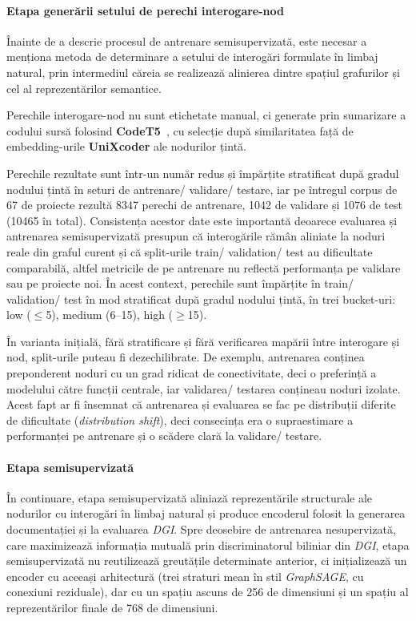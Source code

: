 \documentclass[12pt]{article}
\numberwithin{equation}{section}
\numberwithin{figure}{section}
\numberwithin{table}{section}
\theoremstyle{definition}
\theoremstyle{plain}
\begin{document}
\paragraph{Etapa generării setului de perechi interogare-nod}

Înainte de a descrie procesul de antrenare semisupervizată, este necesar a menționa metoda de determinare a setului de interogări formulate în limbaj natural, prin intermediul căreia se realizează alinierea dintre spațiul grafurilor și cel al reprezentărilor semantice.

Perechile interogare-nod nu sunt etichetate manual, ci generate prin sumarizare a codului sursă folosind \textbf{CodeT5}~\cite{wang2021codet5}, cu selecție după similaritatea față de embedding-urile \textbf{UniXcoder} ale nodurilor țintă. 

Perechile rezultate sunt într-un număr redus și împărțite stratificat după gradul nodului țintă în seturi de antrenare/ validare/ testare, iar pe întregul corpus de 67 de proiecte rezultă 8347 perechi de antrenare, 1042 de validare și 1076 de test (10465 în total). Consistența acestor date este importantă deoarece evaluarea și antrenarea semisupervizată presupun că interogările rămân aliniate la noduri reale din graful curent și că split-urile train/ validation/ test au dificultate comparabilă, altfel metricile de pe antrenare nu reflectă performanța pe validare sau pe proiecte noi. În acest context, perechile sunt împărțite în train/ validation/ test în mod stratificat după gradul nodului țintă, în trei bucket-uri: low ($\leq$5), medium (6–15), high ($\geq$15).

În varianta inițială, fără stratificare și fără verificarea mapării între interogare și nod, split-urile puteau fi dezechilibrate. De exemplu, antrenarea conținea preponderent noduri cu un grad ridicat de conectivitate, deci o preferință a modelului către funcții centrale, iar validarea/ testarea conțineau noduri izolate. Acest fapt ar fi însemnat că antrenarea și evaluarea se fac pe distribuții diferite de dificultate (\textit{distribution shift}), deci consecința era o supraestimare a performanței pe antrenare și o scădere clară la validare/ testare.

\paragraph{Etapa semisupervizată}

În continuare, etapa semisupervizată aliniază reprezentările structurale ale nodurilor cu interogări în limbaj natural și produce encoderul folosit la generarea documentației și la evaluarea \textit{DGI}. Spre deosebire de antrenarea nesupervizată, care maximizează informația mutuală prin discriminatorul biliniar din \textit{DGI}, etapa semisupervizată nu reutilizează greutățile determinate anterior, ci inițializează un encoder cu aceeași arhitectură (trei straturi mean în stil \textit{GraphSAGE}, cu conexiuni reziduale), dar cu un spațiu ascuns de 256 de dimensiuni și un spațiu al reprezentărilor finale de 768 de dimensiuni.
\end{document}

